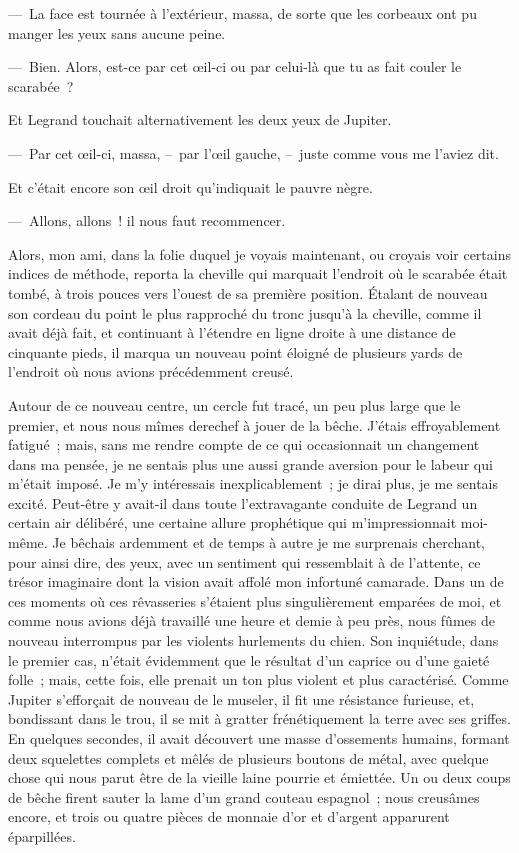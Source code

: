 \documentclass[french,twoside]{book} %
\begin{document}
— La face est tournée à l’extérieur, massa, de sorte que les corbeaux ont pu manger les yeux sans aucune peine.\par
— Bien. Alors, est-ce par cet œil-ci ou par celui-là que tu as fait couler le scarabée ?\par
Et Legrand touchait alternativement les deux yeux de Jupiter.\par
— Par cet œil-ci, massa, – par l’œil gauche, – juste comme vous me l’aviez dit.\par
Et c’était encore son œil droit qu’indiquait le pauvre nègre.\par
— Allons, allons ! il nous faut recommencer.\par
Alors, mon ami, dans la folie duquel je voyais maintenant, ou croyais voir certains indices de méthode, reporta la cheville qui marquait l’endroit où le scarabée était tombé, à trois pouces vers l’ouest de sa première position. Étalant de nouveau son cordeau du point le plus rapproché du tronc jusqu’à la cheville, comme il avait déjà fait, et continuant à l’étendre en ligne droite à une distance de cinquante pieds, il marqua un nouveau point éloigné de plusieurs yards de l’endroit où nous avions précédemment creusé.\par
Autour de ce nouveau centre, un cercle fut tracé, un peu plus large que le premier, et nous nous mîmes derechef à jouer de la bêche. J’étais effroyablement fatigué ; mais, sans me rendre compte de ce qui occasionnait un changement dans ma pensée, je ne sentais plus une aussi grande aversion pour le labeur qui m’était imposé. Je m’y intéressais inexplicablement ; je dirai plus, je me sentais excité. Peut-être y avait-il dans toute l’extravagante conduite de Legrand un certain air délibéré, une certaine allure prophétique qui m’impressionnait moi-même. Je bêchais ardemment et de temps à autre je me surprenais cherchant, pour ainsi dire, des yeux, avec un sentiment qui ressemblait à de l’attente, ce trésor imaginaire dont la vision avait affolé mon infortuné camarade. Dans un de ces moments où ces rêvasseries s’étaient plus singulièrement emparées de moi, et comme nous avions déjà travaillé une heure et demie à peu près, nous fûmes de nouveau interrompus par les violents hurlements du chien. Son inquiétude, dans le premier cas, n’était évidemment que le résultat d’un caprice ou d’une gaieté folle ; mais, cette fois, elle prenait un ton plus violent et plus caractérisé. Comme Jupiter s’efforçait de nouveau de le museler, il fit une résistance furieuse, et, bondissant dans le trou, il se mit à gratter frénétiquement la terre avec ses griffes. En quelques secondes, il avait découvert une masse d’ossements humains, formant deux squelettes complets et mêlés de plusieurs boutons de métal, avec quelque chose qui nous parut être de la vieille laine pourrie et émiettée. Un ou deux coups de bêche firent sauter la lame d’un grand couteau espagnol ; nous creusâmes encore, et trois ou quatre pièces de monnaie d’or et d’argent apparurent éparpillées.\par
\end{document}
